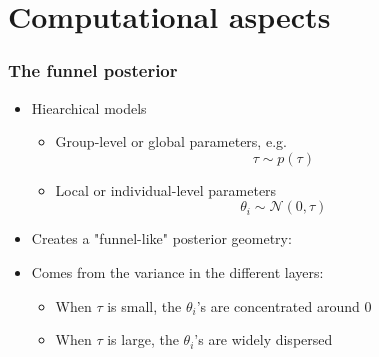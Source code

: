 \documentclass[10pt]{beamer}
\begin{document}



\section{Computational aspects}
\frame{\sectionpage}

\begin{frame}
\frametitle{The funnel posterior }

  \begin{itemize}
  \item Hiearchical models
  \begin{itemize}
  \item Group-level or global parameters, e.g.
  \[
  \tau \sim p(\tau)
  \]
  \item Local or individual-level parameters
  \[
  \theta_i \sim \mathcal{N}(0, \tau)
  \]
  \end{itemize}
  \item Creates a "funnel-like" posterior geometry:
  \item Comes from the variance in the different layers:
  \begin{itemize}
  \item When $\tau$ is small, the $\theta_i$'s are concentrated around 0
  \item When $\tau$ is large, the $\theta_i$'s are widely dispersed
  \end{itemize}
  \end{itemize}
\end{frame}
\end{document}
